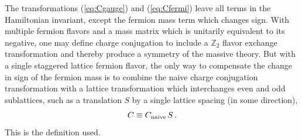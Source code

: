 \documentclass [12pt]{article}
\begin{document}
The transformations (\ref{eq:Cgauge}) and (\ref{eq:Cfermi}) leave all terms
in the Hamiltonian invariant, except the fermion mass term which changes sign.
With multiple fermion flavors and a mass matrix which is unitarily
equivalent to its negative, one may define charge conjugation to include
a $\mathbb Z_2$ flavor exchange transformation and thereby produce a
symmetry of the massive theory.
But with a single staggered lattice fermion flavor, the only way to compensate
the change in sign of the fermion mass is to combine the naive charge
conjugation transformation with a lattice transformation which interchanges
even and odd sublattices, such as a translation $S$ by a single lattice spacing
(in some direction),
\begin{align}
    C \equiv C_{\rm naive} \, S \,.
\end{align}
This is the definition used.
\end{document}

